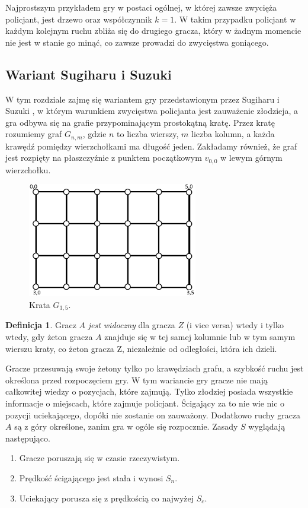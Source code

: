 \documentclass{xmgr}
\theoremstyle{definition}
\newtheorem{Definicja}{Definicja}
\begin{document}
Najprostszym przykładem gry w postaci ogólnej, w której zawsze zwycięża policjant, jest drzewo oraz współczynnik $k = 1$. W takim przypadku policjant w każdym kolejnym ruchu zbliża się do drugiego gracza, który w żadnym momencie nie jest w stanie go minąć, co zawsze prowadzi do zwycięstwa goniącego.

\subsection{Wariant Sugiharu i Suzuki} \label{sugiharu}
W tym rozdziale zajmę się wariantem gry przedstawionym przez Sugiharu i Suzuki \cite{sugiharu}, w którym warunkiem zwycięstwa policjanta jest zauważenie złodzieja, a gra odbywa się na grafie przypominającym prostokątną kratę.
Przez kratę rozumiemy graf $G_{n,m}$, gdzie $n$ to liczba wierszy, $m$ liczba kolumn, a każda krawędź pomiędzy wierzchołkami ma długość jeden. Zakładamy również, że graf jest rozpięty na płaszczyźnie z punktem początkowym $v_{0,0}$ w lewym górnym wierzchołku.
\begin{figure}[ht!]
   \centering
    \includegraphics[height=5cm]{rysunki/siatka_3_5.png}
    \caption{Krata $G_{3,5}$.}
\end{figure}

\begin{Definicja}
  Gracz $A$ \emph{jest widoczny} dla gracza $Z$ (i vice versa) wtedy i tylko wtedy, gdy żeton gracza $A$ znajduje się w tej samej kolumnie lub w tym samym wierszu kraty, co żeton gracza Z, niezależnie od odległości, która ich dzieli.
\end{Definicja}

Gracze przesuwają swoje żetony tylko po krawędziach grafu, a szybkość ruchu jest określona przed rozpoczęciem gry.
W tym wariancie gry gracze nie mają całkowitej wiedzy o pozycjach, które zajmują. Tylko złodziej posiada wszystkie informacje o miejscach, które zajmuje policjant. Ścigający za to nie wie nic o pozycji uciekającego, dopóki nie zostanie on zauważony. Dodatkowo ruchy gracza $A$ są z góry określone, zanim gra w ogóle się rozpocznie.
Zasady $S$ wyglądają następująco.
\begin{enumerate}
  \item Gracze poruszają się w czasie rzeczywistym.
  \item Prędkość ścigającego jest stała i wynosi $S_n$.
  \item Uciekający porusza się z prędkością co najwyżej $S_c$.
\end{enumerate}
\end{document}
